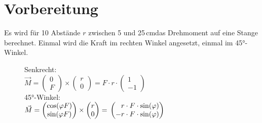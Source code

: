 

\section{Vorbereitung}
\label{sec:Vorbereitung}
Es wird für 10 Abstände $r$ zwischen 5 und 25\,cmdas Drehmoment auf eine Stange berechnet. 
Einmal wird die Kraft im rechten Winkel angesetzt, einmal im 45°-Winkel. \\ \noindent
\begin{figure}
    \begin{minipage}{0.39\textwidth}
    Senkrecht:\\
    $\vec M=\begin{pmatrix} 0\\F\end{pmatrix}\times
    \begin{pmatrix} r\\0\end{pmatrix}=F\cdot r\cdot\begin{pmatrix} 1\\-1\end{pmatrix}$\\
    45°-Winkel:\\
    $\vec M=\begin{pmatrix} \cos(\varphi F)\\ \sin(\varphi F)\end{pmatrix}
    \times \begin{pmatrix} r\\0 \end{pmatrix}=\\
    \begin{pmatrix} 
    \phantom{-}r\cdot F\cdot\sin(\varphi)\\ -r\cdot F\cdot\sin(\varphi)\end{pmatrix}$
    \end{minipage}
    \hfill
    \begin{minipage}{0.39\textwidth}
\end{minipage}
\end{figure}

